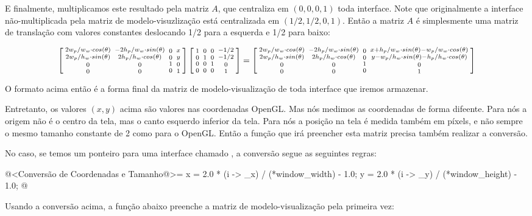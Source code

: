 E finalmente, multiplicamos este resultado pela matriz $A$, que
centraliza em $(0, 0, 0, 1)$ toda interface. Note que originalmente
a interface não-multiplicada pela matriz de modelo-visuzlização está
centralizada em $(1/2, 1/2, 0, 1)$. Então a matriz $A$ é simplesmente
uma matriz de translação com valores constantes deslocando 1/2 para a
esquerda e 1/2 para baixo:

$$
\left[{{2w_p/w_w\cdot cos(\theta) \atop 2w_p/h_w\cdot sin(\theta)}
\atop {0\atop 0}}
  {{-2h_p/w_w\cdot sin(\theta) \atop 2h_p/h_w\cdot cos(\theta)}\atop
  {0 \atop 0}} {{0\atop 0}\atop{1 \atop 0}} {{x \atop y}\atop{0\atop
  1}}\right]
\left[{{1 \atop 0}\atop {0\atop 0}}{{0 \atop 1}\atop {0 \atop
      0}}{{0\atop 0}\atop{1 \atop 0}}{{-1/2 \atop -1/2}\atop{0\atop
      1}}\right]=

\left[{{2w_p/w_w\cdot cos(\theta) \atop 2w_p/h_w\cdot sin(\theta)}
\atop {0\atop 0}}
  {{-2h_p/w_w\cdot sin(\theta) \atop 2h_p/h_w\cdot cos(\theta)}\atop
  {0 \atop 0}} {{0\atop 0}\atop{1 \atop 0}} {{x+h_p/w_w\cdot
  sin(\theta)-w_p/w_w\cdot cos(\theta) \atop y-w_p/h_w\cdot
  sin(\theta)-h_p/h_w\cdot cos(\theta)}\atop{0\atop 1}}\right]
$$

O formato acima então é a forma final da matriz de modelo-visualização
de toda interface que iremos armazenar.

Entretanto, os valores $(x, y)$ acima são valores nas coordenadas
OpenGL. Mas nós medimos as coordenadas de forma difeente. Para nós a
origem não é o centro da tela, mas o canto esquerdo inferior da
tela. Para nós a posição na tela é medida também em píxels, e não
sempre o mesmo tamanho constante de 2 como para o OpenGL. Então a
função que irá preencher esta matriz precisa também realizar a
conversão.

No caso, se temos um ponteiro para uma interface
chamado , a conversão segue as seguintes regras:

\iniciocodigo
@<Conversão de Coordenadas e Tamanho@>=
x = 2.0 * (i -> _x) / (*window_width) - 1.0;
y = 2.0 * (i -> _y) / (*window_height) - 1.0;
@
\fimcodigo

Usando a conversão acima, a função abaixo preenche a matriz de
modelo-visualização pela primeira vez:

